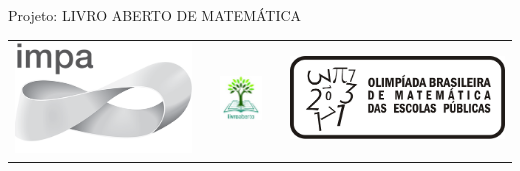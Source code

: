 \renewcommand\chapterillustration{./abertura-estatistica1}%
\def\chapterwhat{}
\def\chapterbecause{} 

\mbox{}\thispagestyle{empty}\clearpage

\thispagestyle{empty}

\begin{center}
Projeto: LIVRO ABERTO DE MATEMÁTICA

\noindent \begin{tabular}{lcccr}
\includegraphics[scale=.15]{impa}& \quad\quad& \includegraphics[width=3cm]{logo} & \quad\quad& \includegraphics[scale=.24]{obmep} 
\end{tabular}
\end{center}

\vspace*{.3cm}

